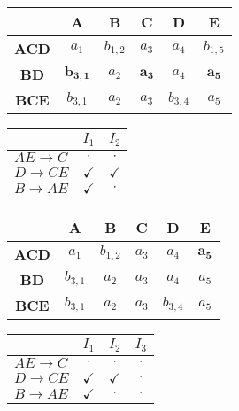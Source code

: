 \begin{multicols}{2}
   \begin{center}
  \begin{tabular}{c|c|c|c|c|c}
    & \textbf{A} & \textbf{B} &\textbf{C} &\textbf{D}     &\textbf{E}\\
   \hline
   \textbf{ACD} & $a_1$       & $b_{1,2}$ & $a_3$ & $a_4$ & $b_{1,5}$ \\
   \hline
   \textbf{BD}  & $\mathbf{b_{3,1}}$  & $a_2$ & $\mathbf{a_3}$ & $a_4$ & $\mathbf{a_5}$ \\
   \hline
   \textbf{BCE} & $b_{3,1}$   & $a_2$  & $a_3$ & $b_{3,4}$ & $a_5$\\
  \end{tabular}
 \end{center}
 
  \begin{center}
  \begin{tabular}{l|c|c}
   & $I_1$ & $I_2$\\
   \hline
   $AE\rightarrow C$ & $\cdot$ & $\cdot$\\
   $D\rightarrow CE$& $\checkmark$& $\checkmark$\\
   $B \rightarrow AE$ & $\checkmark$& $\cdot$\\
  \end{tabular}
 \end{center}
 \end{multicols}

 \begin{multicols}{2}
   \begin{center}
  \begin{tabular}{c|c|c|c|c|c}
    & \textbf{A} & \textbf{B} &\textbf{C} &\textbf{D} &\textbf{E}\\
   \hline
   \textbf{ACD} & $a_1$  & $b_{1,2}$ & $a_3$ & $a_4$ & $\mathbf{a_5}$ \\
   \hline
   \textbf{BD}  & $b_{3,1}$ & $a_2$ & $a_3$ & $a_4$ & $a_5$ \\
   \hline
   \textbf{BCE} & $b_{3,1}$   & $a_2$  & $a_3$ & $b_{3,4}$ & $a_5$\\
  \end{tabular}
 \end{center}
 
  \begin{center}
  \begin{tabular}{l|c|c|c}
   & $I_1$ & $I_2$ & $I_3$\\
   \hline
   $AE\rightarrow C$ & $\cdot$ & $\cdot$ & $\cdot$\\
   $D\rightarrow CE$ & $\checkmark$ & $\checkmark$ & $\cdot$\\
   $B \rightarrow AE$ & $\checkmark$ & $\cdot$ & $\cdot$\\
  \end{tabular}
 \end{center}
 \end{multicols}
 
